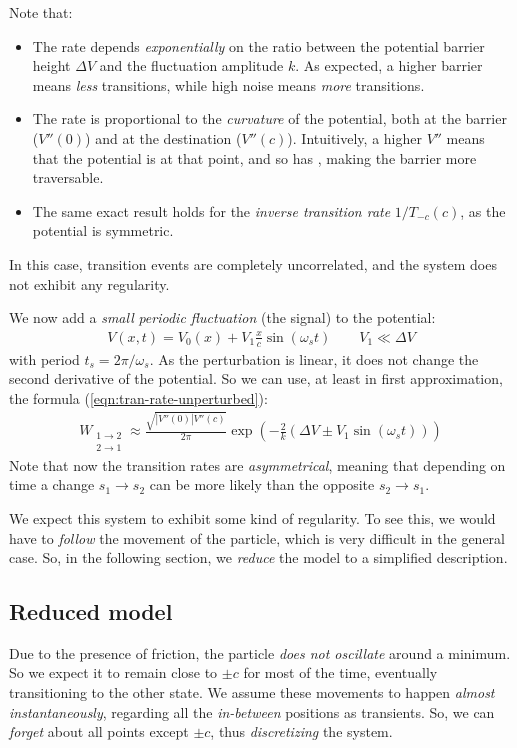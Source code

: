 \documentclass[../template.tex]{subfiles}
\begin{document}
Note that:
\begin{itemize}
    \item The rate depends \textit{exponentially} on the ratio between the potential barrier height $\Delta V$ and the fluctuation amplitude $k$. As expected, a higher barrier means \textit{less}  transitions, while high noise means \textit{more} transitions.  
    \item The rate is proportional to the \textit{curvature} of the potential, both at the barrier ($V''(0)$) and at the destination ($V''(c)$). Intuitively, a higher $V''$ means that the potential is  at that point, and so has , making the barrier more traversable. 
    \item The same exact result holds for the \textit{inverse transition rate} $1/T_{-c}(c)$, as the potential is symmetric. 
\end{itemize}
In this case, transition events are completely uncorrelated, and the system does not exhibit any regularity.

\medskip

We now add a \textit{small} \textit{periodic fluctuation} (the signal) to the potential:
\begin{align*}
    V(x,t) = V_0(x) + V_1 \frac{x}{c} \sin(\omega_s t) \qquad V_1 \ll \Delta V
\end{align*} 
with period $t_s = 2\pi/\omega_s$. As the perturbation is linear, it does not change the second derivative of the potential. So we can use, at least in first approximation, the formula (\ref{eqn:tran-rate-unperturbed}):
\begin{align} \label{eqn:w12}
    W_{\substack{1 \to 2\\2 \to 1}} \approx  \frac{\sqrt{|V''(0)| V''(c)}}{2 \pi} \exp\left(-\frac{2}{k} (\Delta V \pm V_1 \sin(\omega_s t)) \right)
\end{align}
Note that now the transition rates are \textit{asymmetrical}, meaning that depending on time a change $s_1 \to s_2$ can be more likely than the opposite $s_2 \to s_1$.

We expect this system to exhibit some kind of regularity. To see this, we would have to \textit{follow} the movement of the particle, which is very difficult in the general case. So, in the following section, we \textit{reduce} the model to a simplified description.

\subsection{Reduced model}
Due to the presence of friction, the particle \textit{does not oscillate} around a minimum. So we expect it to remain close to $\pm c$ for most of the time, eventually transitioning to the other state. We assume these movements to happen \textit{almost instantaneously}, regarding all the \textit{in-between} positions as transients. So, we can \textit{forget} about all points except $\pm c$, thus \textit{discretizing} the system.
\end{document}
